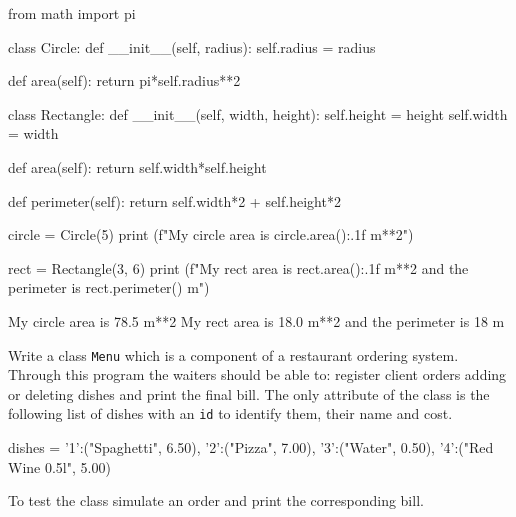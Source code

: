 \cprotEnv\begin{solution}
\begin{ipython}
from math import pi

class Circle:
    def __init__(self, radius):
        self.radius = radius

    def area(self):
        return pi*self.radius**2

class Rectangle:
    def __init__(self, width, height):
        self.height = height
        self.width = width

    def area(self):
        return self.width*self.height

    def perimeter(self):
        return self.width*2 + self.height*2

circle = Circle(5)
print (f"My circle area is {circle.area():.1f} m**2")

rect = Rectangle(3, 6)
print (f"My rect area is {rect.area():.1f} m**2 and the perimeter is {rect.perimeter()} m")
\end{ipython}
\begin{ioutput}
My circle area is 78.5 m**2
My rect area is 18.0 m**2 and the perimeter is 18 m
\end{ioutput}
\end{solution}

\cprotEnv\begin{question}
Write a class \texttt{Menu} which is a component of a restaurant ordering system. Through this program the waiters should be able to: register client orders adding or deleting dishes and print the final bill.
The only attribute of the class is the following list of dishes with an \texttt{id} to identify them, their name and cost.

\begin{ipython}
dishes = {'1':("Spaghetti", 6.50), '2':("Pizza", 7.00), '3':("Water", 0.50),
                       '4':("Red Wine 0.5l", 5.00)}
\end{ipython}
\noindent
To test the class simulate an order and print the corresponding bill.
\end{question}

